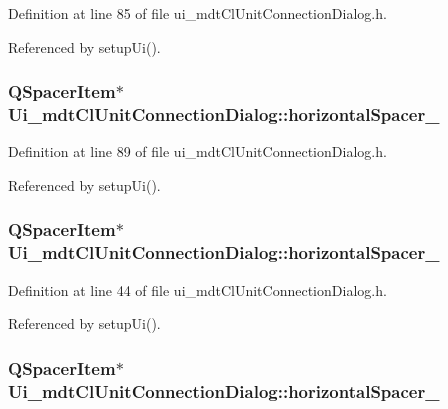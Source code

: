Definition at line 85 of file ui\-\_\-mdt\-Cl\-Unit\-Connection\-Dialog.\-h.



Referenced by setup\-Ui().

\hypertarget{class_ui__mdt_cl_unit_connection_dialog_a87549891f59b48945746bc9740c2a3ae}{
\subsubsection[{horizontal\-Spacer\-\_\-2}]{\setlength{\rightskip}{0pt plus 5cm}Q\-Spacer\-Item$\ast$ Ui\-\_\-mdt\-Cl\-Unit\-Connection\-Dialog\-::horizontal\-Spacer\-\_}}\label{class_ui__mdt_cl_unit_connection_dialog_a87549891f59b48945746bc9740c2a3ae}


Definition at line 89 of file ui\-\_\-mdt\-Cl\-Unit\-Connection\-Dialog.\-h.



Referenced by setup\-Ui().

\hypertarget{class_ui__mdt_cl_unit_connection_dialog_a7762bb38617183a944b162164939b47c}{
\subsubsection[{horizontal\-Spacer\-\_\-3}]{\setlength{\rightskip}{0pt plus 5cm}Q\-Spacer\-Item$\ast$ Ui\-\_\-mdt\-Cl\-Unit\-Connection\-Dialog\-::horizontal\-Spacer\-\_}}\label{class_ui__mdt_cl_unit_connection_dialog_a7762bb38617183a944b162164939b47c}


Definition at line 44 of file ui\-\_\-mdt\-Cl\-Unit\-Connection\-Dialog.\-h.



Referenced by setup\-Ui().

\hypertarget{class_ui__mdt_cl_unit_connection_dialog_a372347c12b71afd4f29f181c9657848f}{
\subsubsection[{horizontal\-Spacer\-\_\-4}]{\setlength{\rightskip}{0pt plus 5cm}Q\-Spacer\-Item$\ast$ Ui\-\_\-mdt\-Cl\-Unit\-Connection\-Dialog\-::horizontal\-Spacer\-\_}}\label{class_ui__mdt_cl_unit_connection_dialog_a372347c12b71afd4f29f181c9657848f}


